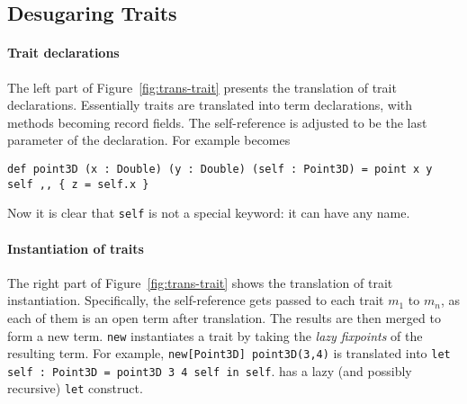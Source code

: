 \subsection{Desugaring Traits}

\paragraph{Trait declarations}

The left part of Figure~\ref{fig:trans-trait} presents the translation of trait
declarations. Essentially traits are translated into term declarations, with
methods becoming record fields. The self-reference is adjusted to be the last
parameter of the declaration. For example
becomes
\begin{lstlisting}
def point3D (x : Double) (y : Double) (self : Point3D) = point x y self ,, { z = self.x }
\end{lstlisting}
Now it is clear that \lstinline{self} is not a special keyword: it can have any
name.



\paragraph{Instantiation of traits}

The right part of Figure~\ref{fig:trans-trait} shows the translation of trait
instantiation. Specifically, the self-reference gets passed to each trait $m_1$
to $m_n$, as each of them is an open term after translation. The results are
then merged to form a new term. \lstinline{new} instantiates a trait by
taking the \textit{lazy fixpoints} of the resulting term. For example,
\lstinline{new[Point3D] point3D(3,4)} is translated into \lstinline{let self : Point3D = point3D 3 4 self in self}.
\name has a lazy (and possibly recursive) \lstinline{let} construct.




